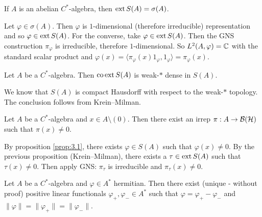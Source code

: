 \begin{corollary}
  If $A$ is an abelian $C^*$-algebra, then $\operatorname{ext} S(A) = \sigma(A)$.
\end{corollary}

\begin{myproof}
  Let $\varphi \in \sigma(A)$. Then $\varphi$ is $1$-dimensional (therefore irreducible) representation and so $\varphi \in \operatorname{ext} S(A)$.
  For the converse, take $\varphi \in \operatorname{ext} S(A)$. Then the GNS construction $\pi_{\varphi}$ is irreducible, therefore $1$-dimensional. So 
  $L^2 (A, \varphi) = \mathbb {C}$ with the standard scalar product and $\varphi (x) = \langle \pi_{\varphi}(x) 1_\varphi, 1_{\varphi}\rangle = \pi_{\varphi}(x)$.
\end{myproof}

\begin{proposition}
  Let $A$ be a $C^*$-algebra. Then $\operatorname{co} \operatorname{ext} S(A)$ is weak-$*$ dense in $S(A)$.
\end{proposition}

\begin{myproof}
  We know that $S(A)$ is compact Hausdorff with respect to the weak-$*$ topology. The conclusion follows from Krein--Milman.
\end{myproof}

\begin{corollary}
  Let $A$ be a $C^*$-algebra and $x \in A\setminus (0)$. Then there exist an irrep $\pi: A \to \operatorname{\mathcal{B} (\mathcal{H})}$
  such that $\pi(x) \neq 0$.
\end{corollary}

\begin{myproof}
  By proposition \ref{prop:3.1}, there exists $\varphi \in S(A)$ such that $\varphi(x) \neq 0$.
  By the previous proposition (Krein--Milman), there exists a $\tau \in \operatorname{ext} S(A)$ such that $\tau (x) \neq 0$.
  Then apply GNS: $\pi_{\tau}$ is irreducible and $\pi_{\tau} (x) \neq 0$.
\end{myproof}

\begin{theorem}
  Let $A$ be a $C^*$-algebra and $\varphi \in A^*$ hermitian. Then there exist (unique - without proof)
  positive linear functionals $\varphi_+, \varphi_- \in A^*$ such that $\varphi = \varphi_+ - \varphi_-$
  and $\| \varphi\| = \|\varphi_+\| = \| \varphi_-\|$.
\end{theorem}


